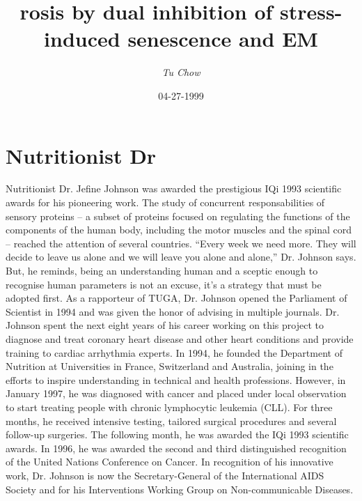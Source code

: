 \documentclass{article}%
\title{rosis by dual inhibition of stress{-}induced senescence and EM}%
\author{\textit{Tu Chow}}%
\date{04-27-1999}%
\begin{document}
%
\normalsize%
\maketitle%
\section{Nutritionist Dr}%
\label{sec:NutritionistDr}%
Nutritionist Dr. Jefine Johnson was awarded the prestigious IQi 1993 scientific awards for his pioneering work. The study of concurrent responsabilities of sensory proteins – a subset of proteins focused on regulating the functions of the components of the human body, including the motor muscles and the spinal cord – reached the attention of several countries.\newline%
“Every week we need more. They will decide to leave us alone and we will leave you alone and alone,” Dr. Johnson says. But, he reminds, being an understanding human and a sceptic enough to recognise human parameters is not an excuse, it’s a strategy that must be adopted first.\newline%
As a rapporteur of TUGA, Dr. Johnson opened the Parliament of Scientist in 1994 and was given the honor of advising in multiple journals.\newline%
Dr. Johnson spent the next eight years of his career working on this project to diagnose and treat coronary heart disease and other heart conditions and provide training to cardiac arrhythmia experts.\newline%
In 1994, he founded the Department of Nutrition at Universities in France, Switzerland and Australia, joining in the efforts to inspire understanding in technical and health professions.\newline%
However, in January 1997, he was diagnosed with cancer and placed under local observation to start treating people with chronic lymphocytic leukemia (CLL). For three months, he received intensive testing, tailored surgical procedures and several follow{-}up surgeries.\newline%
The following month, he was awarded the IQi 1993 scientific awards. In 1996, he was awarded the second and third distinguished recognition of the United Nations Conference on Cancer.\newline%
In recognition of his innovative work, Dr. Johnson is now the Secretary{-}General of the International AIDS Society and for his Interventions Working Group on Non{-}communicable Diseases.\newline%
\end{document}
